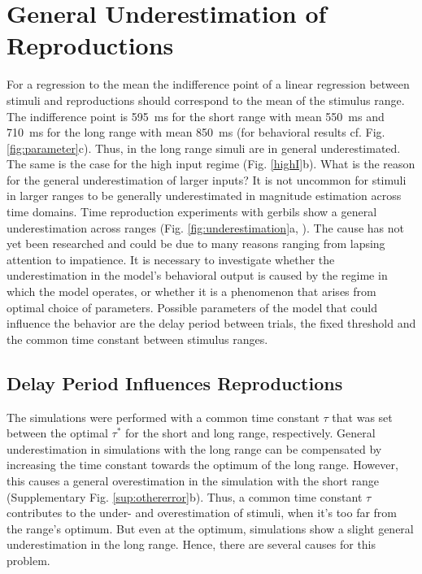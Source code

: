 \documentclass[10pt]{article}
\begin{document}
\section{General Underestimation of Reproductions}
For a regression to the mean the indifference point of a linear regression between stimuli and reproductions should correspond to the mean of the stimulus range.
The indifference point is 595~ms for the short range with mean 550~ms and 710~ms for the long range with mean 850~ms (for behavioral results cf. Fig. \ref{fig:parameter}c). Thus, in the long range simuli are in general underestimated. 
The same is the case for the high input regime (Fig. \ref{highI}b).
What is the reason for the general underestimation of larger inputs? 
It is not uncommon for stimuli in larger ranges to be generally underestimated in magnitude estimation across time domains. Time reproduction experiments with gerbils show a general underestimation across ranges (Fig. \ref{fig:underestimation}a, \cite{Henke2022}). 
The cause has not yet been researched and could be due to many reasons ranging from lapsing attention to impatience. 
It is necessary to investigate whether the underestimation in the model's behavioral output is caused by the regime in which the model operates, or whether it is a phenomenon that arises from optimal choice of parameters.
Possible parameters of the model that could influence the behavior are the delay period between trials, the fixed threshold and the common time constant between stimulus ranges. 

\subsection{Delay Period Influences Reproductions}
The simulations were performed with a common time constant $\tau$ that was set between the optimal $\tau^*$ for the short and long range, respectively.
General underestimation in simulations with the long range can be compensated by increasing the time constant towards the optimum of the long range. However, this causes a general overestimation in the simulation with the short range (Supplementary Fig. \ref{sup:othererror}b). 
Thus, a common time constant $\tau$ contributes to the under- and overestimation of stimuli, when it's too far from the range's optimum. But even at the optimum, simulations show a slight general underestimation in the long range.
Hence, there are several causes for this problem.
\end{document}
